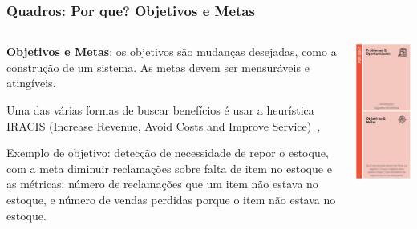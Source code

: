 \documentclass[aspectratio=169]{beamer}
\begin{document}
\begin{frame}
\frametitle{Quadros:  Por que? 
 Objetivos e Metas}
\begin{columns}
        \begin{column}{.66\textwidth}
        
            \textbf{Objetivos e Metas}: os objetivos são mudanças desejadas, como a construção de um sistema. As metas devem ser mensuráveis e atingíveis.


Uma das várias formas de buscar benefícios é usar a heurística IRACIS (Increase Revenue, Avoid Costs and Improve  Service)~\citep{gane:sarson:ssa,ruble_practical_1997},             

Exemplo de objetivo: detecção de necessidade de repor o estoque, com a meta diminuir reclamações sobre falta de item no estoque e as métricas: número de reclamações que um item não estava no estoque, e número de vendas perdidas porque o item não estava no estoque.


        \end{column}
        \begin{column}{.33\textwidth}
\includegraphics[height=0.7\textheight]{detalhes/Porque.png} 
        \end{column}
    \end{columns}

\end{frame}
\end{document}
